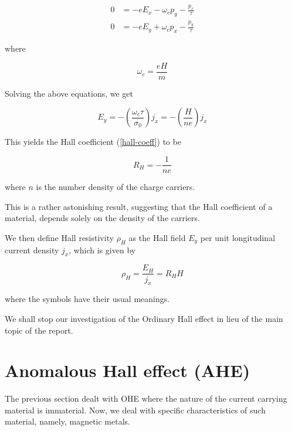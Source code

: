 \begin{equation}
    \begin{split}
        0 &= -e E_x - \omega_c p_y - \frac{p_x}{\tau}\\
        0 &= -e E_y + \omega_c p_x - \frac{p_y}{\tau}
    \end{split}
\end{equation}

where

\begin{equation}
    \omega_c = \frac{e H}{m}
\end{equation}

Solving the above equations, we get

\begin{equation}
    E_y = - \left( \frac{\omega_c \tau}{\sigma_0}  \right) j_x = - \left( \frac{H}{ne} \right) j_x
\end{equation}

This yields the Hall coefficient (\cref{hall-coeff}) to be

\begin{equation}
    \boxed{R_H = - \frac{1}{ne}}
\end{equation}

where $ n $ is the number density of the charge carriers.

This is a rather astonishing result, suggesting that the Hall coefficient of a material, depends solely on the density of the carriers.

We then define Hall resistivity $ \rho_H $ as the Hall field $ E_y $ per unit longitudinal current density $ j_x $, which is given by

\begin{equation} \label{hall-resistivity}
    \boxed{\rho_H = \frac{E_H}{j_x} = R_H H}
\end{equation}

where the symbols have their usual meanings.

We shall stop our investigation of the Ordinary Hall effect in lieu of the main topic of the report.

\section{Anomalous Hall effect (AHE)}

The previous section dealt with OHE where the nature of the current carrying material is immaterial.
Now, we deal with specific characteristics of such material, namely, magnetic metals.

